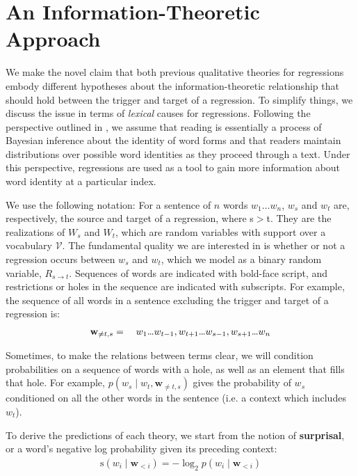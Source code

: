 \documentclass[12pt]{article}
\newcommand{\vocab}{\mathcal{V}}
\newcommand\compactdots{\hbox to 0.7em{.\hss.\hss.}}
\newcommand{\targetindex}{t}
\newcommand{\sourceindex}{s}
\newcommand{\bothindex}{\targetindex, \sourceindex}
\newcommand{\target}{$w_{\targetindex}$\xspace}
\newcommand{\targetmath}{w_{\targetindex}}
\newcommand{\Target}{$W_{\targetindex}$\xspace}
\newcommand{\source}{$w_{\sourceindex}$\xspace}
\newcommand{\Source}{$W_{\sourceindex}$\xspace}
\newcommand{\sourcemath}{w_{\sourceindex}\xspace}
\newcommand{\bw}{\mathbf{w}}
\newcommand{\maskbothmath}{\bw_{\neq \bothindex}}
\newcommand{\regression}{$R_{\sourceindex \rightarrow \targetindex}$\xspace}
\begin{document}
\section{An Information-Theoretic Approach}

We make the novel claim that both previous qualitative theories for regressions embody different hypotheses about the information-theoretic relationship that should hold between the trigger and target of a regression. To simplify things, we discuss the issue in terms of \textit{lexical} causes for regressions. Following the perspective outlined in \cite{bicknell2010rational, bicknell2011readers}, we assume that reading is essentially a process of Bayesian inference about the identity of word forms and that readers maintain distributions over possible word identities as they proceed through a text. Under this perspective, regressions are used as a tool to gain more information about word identity at a particular index.

We use the following notation: For a sentence of $n$ words $w_1 \dots w_n$, \source and \target are, respectively, the source and target of a regression, where \sourceindex $>$\targetindex. They are the realizations of \Source and \Target, which are random variables with support over a vocabulary $\vocab$. The fundamental quality we are interested in is whether or not a regression occurs between \source and \target, which we model as a binary random variable, \regression. Sequences of words are indicated with bold-face script, and restrictions or holes in the sequence are indicated with subscripts. For example, the sequence of all words in a sentence excluding the trigger and target of a regression is:
%
\begin{align}
    \maskbothmath = \quad w_1 \compactdots w_{t-1},w_{t+1} \compactdots w_{s-1}, w_{s+1} \compactdots w_n \nonumber
\end{align}

Sometimes, to make the relations between terms clear, we will condition probabilities on a sequence of words with a hole, as well as an element that fills that hole. For example, $p(\sourcemath \mid \targetmath, \maskbothmath)$ gives the probability of \source conditioned on all the other words in the sentence (i.e. a context which includes \target).

To derive the predictions of each theory, we start from the notion of \textbf{surprisal}, or a word's negative log probability given its preceding context:
%
\begin{align}
    \mathrm{s}(w_i \mid \mathbf{w}_{<i}) = - \log_2 p(w_i \mid \mathbf{w}_{<i})
\end{align}
\end{document}
